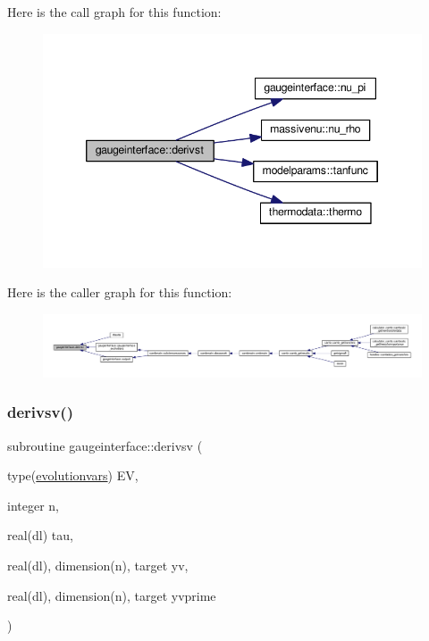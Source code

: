 Here is the call graph for this function\+:
\nopagebreak
\begin{figure}[H]
\begin{center}
\leavevmode
\includegraphics[width=346pt]{namespacegaugeinterface_ab2ff4cd74364457862a7ff44fb2ca978_cgraph}
\end{center}
\end{figure}
Here is the caller graph for this function\+:
\nopagebreak
\begin{figure}[H]
\begin{center}
\leavevmode
\includegraphics[width=350pt]{namespacegaugeinterface_ab2ff4cd74364457862a7ff44fb2ca978_icgraph}
\end{center}
\end{figure}
\mbox{\label{namespacegaugeinterface_a25ee0c9e055aabce6b7eb205e65f9804}} 
\subsubsection{\texorpdfstring{derivsv()}{derivsv()}}
{\footnotesize\ttfamily subroutine gaugeinterface\+::derivsv (\begin{DoxyParamCaption}\item[{type(\mbox{\hyperlink{structgaugeinterface_1_1evolutionvars}{evolutionvars}})}]{EV,  }\item[{integer}]{n,  }\item[{real(dl)}]{tau,  }\item[{real(dl), dimension(n), target}]{yv,  }\item[{real(dl), dimension(n), target}]{yvprime }\end{DoxyParamCaption})}




